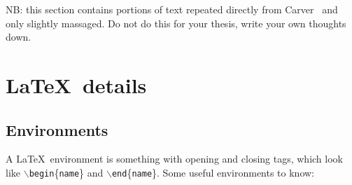 \documentclass{uvamscse}
\newcommand{\cmd}[1]{\texttt{$\backslash$#1}}
\begin{document}
NB: this section contains portions of text repeated directly from Carver~\cite{Carver10} and
only slightly massaged. Do not do this for your thesis, write your own thoughts down.

\section{\LaTeX\ details}

\subsection{Environments}

A \LaTeX\ environment is something with opening and closing tags, which look
like \cmd{begin}\{\texttt{name}\} and \cmd{end}\{\texttt{name}\}. Some useful
environments to know:
\end{document}
